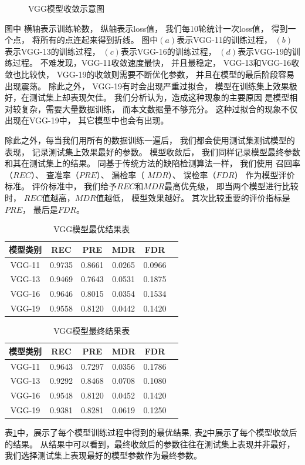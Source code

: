 \begin{figure}[htbp]
\caption{VGG模型收敛示意图}
\label{fig:vggshoulian}
\end{figure}
图中
横轴表示训练轮数，
纵轴表示loss值，
我们每10轮统计一次loss值，
得到一个点，
将所有的点连起来得到折线。
图中$(a)$表示VGG-11的训练过程，
$(b)$表示VGG-13的训练过程，
$(c)$表示VGG-16的训练过程，
$(d)$表示VGG-19的训练过程。
不难发现，VGG-11收敛速度最快，
并且最稳定，
VGG-13和VGG-16收敛也比较快，
VGG-19的收敛则需要不断优化参数，
并且在模型的最后阶段容易出现震荡。
除此之外，
VGG-19有时会出现严重过拟合，
模型在训练集上效果极好，在测试集上却表现欠佳。
我们分析认为，造成这种现象的主要原因
是模型相对较复杂，需要大量数据训练，
而本文数据量不够充分。
这种过拟合的现象不仅出现在VGG-19中，
其它模型中也会有出现。

除此之外，每当我们用所有的数据训练一遍后，
我们都会使用测试集测试模型的表现，
记录测试集上效果最好的参数。
模型收敛后，
我们同样记录模型最终参数和其在测试集上的结果。
同基于传统方法的缺陷检测算法一样，
我们使用
召回率（$REC$）、
查准率（$PRE$）、
漏检率（ $MDR$）、
误检率（$FDR$）
作为模型评价标准。
评价标准中，
我们给予$REC$和$MDR$最高优先级，
即当两个模型进行比较时，
$REC$值越高，$MDR$值越低，
模型效果越好。
其次比较重要的评价指标是$PRE$，
最后是$FDR$。
\begin{table}[htbp]
\centering
\begin{tabular}{cccccp{38mm}}
\toprule
\textbf{模型类别} & \textbf{REC} & \textbf{PRE} & \textbf{MDR} & \textbf{FDR}\\
\midrule
\mbox{VGG-11} & 0.9735 & 0.8661 & 0.0265 & 0.0966\\
\mbox{VGG-13} & 0.9469 & 0.7643 & 0.0531 & 0.1875\\
\mbox{VGG-16} & 0.9646 & 0.8015 & 0.0354 & 0.1534\\
\mbox{VGG-19} & 0.9558 & 0.8120 & 0.0442 & 0.1420\\
\bottomrule
\end{tabular}
\caption{VGG模型最优结果表}
\label{tab:zuiyoujieguo}
\end{table}
\begin{table}[htbp]
\centering
\begin{tabular}{cccccp{38mm}}
\toprule
\textbf{模型类别} & \textbf{REC} & \textbf{PRE} & \textbf{MDR} & \textbf{FDR}\\
\midrule
\mbox{VGG-11} & 0.9643 & 0.7297 & 0.0356 & 0.1786\\
\mbox{VGG-13} & 0.9292 & 0.8468 & 0.0708 & 0.1080\\
\mbox{VGG-16} & 0.9548 & 0.8120 & 0.0452 & 0.1420\\
\mbox{VGG-19} & 0.9381 & 0.8281 & 0.0619 & 0.1250\\
\bottomrule
\end{tabular}
\caption{VGG模型最终结果表}
\label{tab:zuizhongjieguo}
\end{table}
表\ref{tab:zuiyoujieguo}中，展示了每个模型训练过程中得到的最优结果,
表\ref{tab:zuizhongjieguo}中展示了每个模型收敛后的结果。
从结果中可以看到，最终收敛后的参数往往在测试集上表现并非最好，
我们选择测试集上表现最好的模型参数作为最终参数。


